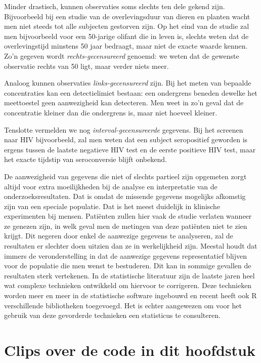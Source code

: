 \documentclass[
  12pt,dutch,coursenotes]{book}
\theoremstyle{definition}
\theoremstyle{definition}
\theoremstyle{definition}
\theoremstyle{remark}
\begin{document}
Minder drastisch, kunnen observaties soms slechts ten dele gekend zijn.
Bijvoorbeeld bij een studie van de overlevingsduur van dieren en planten wacht men niet steeds tot
alle subjecten gestorven zijn. Op het eind van de studie zal men bijvoorbeeld voor een 50-jarige
olifant die in leven is, slechts weten dat de overlevingstijd
minstens 50 jaar bedraagt, maar niet de exacte waarde kennen. Zo'n gegeven
wordt \emph{rechts-gecensureerd} genoemd: we weten dat de gewenste
observatie rechts van 50 ligt, maar verder niets meer.

Analoog kunnen observaties \emph{links-gecensureerd} zijn. Bij het meten
van bepaalde concentraties kan een detectielimiet bestaan: een ondergrens beneden
dewelke het meettoestel geen aanwezigheid kan detecteren. Men weet in zo'n
geval dat de concentratie kleiner dan die ondergrens is, maar niet hoeveel
kleiner.

Tenslotte vermelden we nog \emph{interval-gecensureerde} gegevens. Bij het
screenen naar HIV bijvoorbeeld, zal men weten dat een subject seropositief
geworden is ergens tussen de laatste negatieve HIV test en de eerste
positieve HIV test, maar het exacte tijdstip van seroconversie blijft
onbekend.

De aanwezigheid van gegevens die niet of slechts partieel zijn opgemeten zorgt
altijd voor extra moeilijkheden bij de analyse en interpretatie van de
onderzoeksresultaten. Dat is omdat de missende gegevens mogelijks afkomstig zijn
van een speciale populatie. Dat is het meest duidelijk in klinische experimenten bij mensen.
Patiënten zullen hier vaak de studie verlaten wanneer
ze genezen zijn, in welk geval men de metingen van deze patiënten niet te
zien krijgt. Dit negeren door enkel de aanwezige gegevens te analyseren, zal
de resultaten er slechter doen uitzien dan ze in werkelijkheid zijn. Meestal
houdt dat immers de veronderstelling in dat de aanwezige gegevens representatief blijven
voor de populatie die men wenst te bestuderen. Dit kan in sommige gevallen
de resultaten sterk vertekenen. In de statistische literatuur zijn de
laatste jaren heel wat complexe technieken ontwikkeld om hiervoor te
corrigeren. Deze technieken worden meer en meer in de statistische software
ingebouwd en recent heeft ook R verschillende bibliotheken toegevoegd.
Het is
echter aangewezen om voor het gebruik van deze gevorderde technieken een
statisticus te consulteren.

\hypertarget{clips-over-de-code-in-dit-hoofdstuk}{%
\section{Clips over de code in dit hoofdstuk}\label{clips-over-de-code-in-dit-hoofdstuk}}
\end{document}
